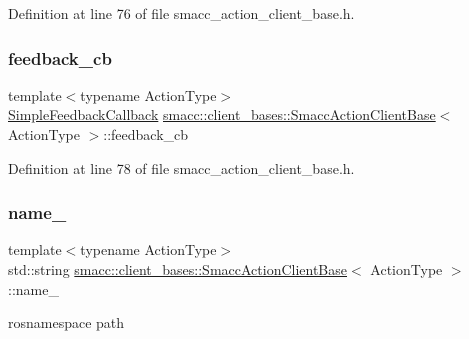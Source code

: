 Definition at line 76 of file smacc\+\_\+action\+\_\+client\+\_\+base.\+h.

\mbox{\label{classsmacc_1_1client__bases_1_1SmaccActionClientBase_a978629b407530f1b7d266a009eff664b}} 
\subsubsection{\texorpdfstring{feedback\+\_\+cb}{feedback\_cb}}
{\footnotesize\ttfamily template$<$typename Action\+Type$>$ \\
\hyperlink{classsmacc_1_1client__bases_1_1SmaccActionClientBase_a207f1655464affc35459f47a35d04069}{Simple\+Feedback\+Callback} \hyperlink{classsmacc_1_1client__bases_1_1SmaccActionClientBase}{smacc\+::client\+\_\+bases\+::\+Smacc\+Action\+Client\+Base}$<$ Action\+Type $>$\+::feedback\+\_\+cb}



Definition at line 78 of file smacc\+\_\+action\+\_\+client\+\_\+base.\+h.

\mbox{\label{classsmacc_1_1client__bases_1_1SmaccActionClientBase_a7f2e1834e915bdf7ae9db8b90b4597e6}} 
\subsubsection{\texorpdfstring{name\+\_\+}{name\_}}
{\footnotesize\ttfamily template$<$typename Action\+Type$>$ \\
std\+::string \hyperlink{classsmacc_1_1client__bases_1_1SmaccActionClientBase}{smacc\+::client\+\_\+bases\+::\+Smacc\+Action\+Client\+Base}$<$ Action\+Type $>$\+::name\+\_\+}



rosnamespace path 



